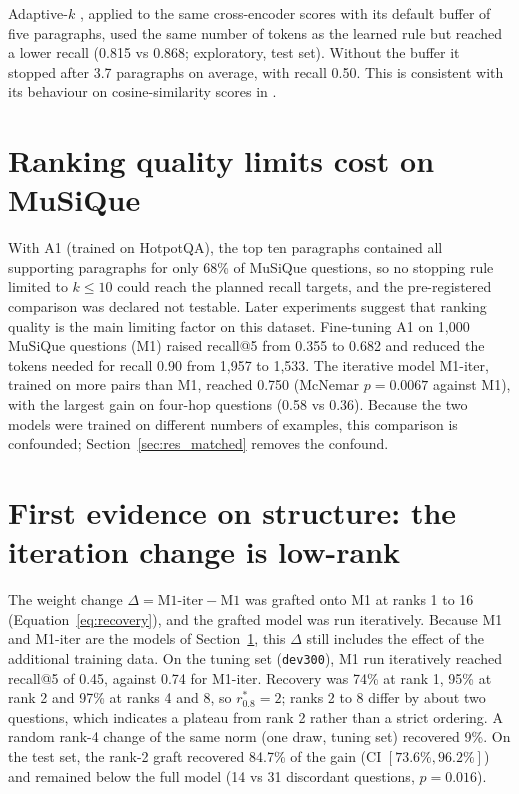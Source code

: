 Adaptive-$k$ \cite{taguchi2025adaptivek}, applied to the same cross-encoder scores with its default buffer of five paragraphs, used the same number of tokens as the learned rule but reached a lower recall (0.815 vs 0.868; exploratory, test set). Without the buffer it stopped after 3.7 paragraphs on average, with recall 0.50. This is consistent with its behaviour on cosine-similarity scores in .

\section{Ranking quality limits cost on MuSiQue}
\label{sec:res_bottleneck}

With A1 (trained on HotpotQA), the top ten paragraphs contained all supporting paragraphs for only 68\% of MuSiQue questions, so no stopping rule limited to $k\le10$ could reach the planned recall targets, and the pre-registered comparison was declared not testable. Later experiments suggest that ranking quality is the main limiting factor on this dataset. Fine-tuning A1 on 1,000 MuSiQue questions (M1) raised recall@5 from 0.355 to 0.682 and reduced the tokens needed for recall 0.90 from 1,957 to 1,533. The iterative model M1-iter, trained on more pairs than M1, reached 0.750 (McNemar $p=0.0067$ against M1), with the largest gain on four-hop questions (0.58 vs 0.36). Because the two models were trained on different numbers of examples, this comparison is confounded; Section~\ref{sec:res_matched} removes the confound.

\section{First evidence on structure: the iteration change is low-rank}
\label{sec:res_rank}

The weight change $\Delta = \text{M1-iter} - \text{M1}$ was grafted onto M1 at ranks 1 to 16 (Equation~\ref{eq:recovery}), and the grafted model was run iteratively. Because M1 and M1-iter are the models of Section~\ref{sec:res_bottleneck}, this $\Delta$ still includes the effect of the additional training data. On the tuning set (\texttt{dev300}), M1 run iteratively reached recall@5 of 0.45, against 0.74 for M1-iter. Recovery was 74\% at rank 1, 95\% at rank 2 and 97\% at ranks 4 and 8, so $r^*_{0.8}=2$; ranks 2 to 8 differ by about two questions, which indicates a plateau from rank 2 rather than a strict ordering. A random rank-4 change of the same norm (one draw, tuning set) recovered 9\%. On the test set, the rank-2 graft recovered 84.7\% of the gain (CI $[73.6\%, 96.2\%]$) and remained below the full model (14 vs 31 discordant questions, $p=0.016$).

